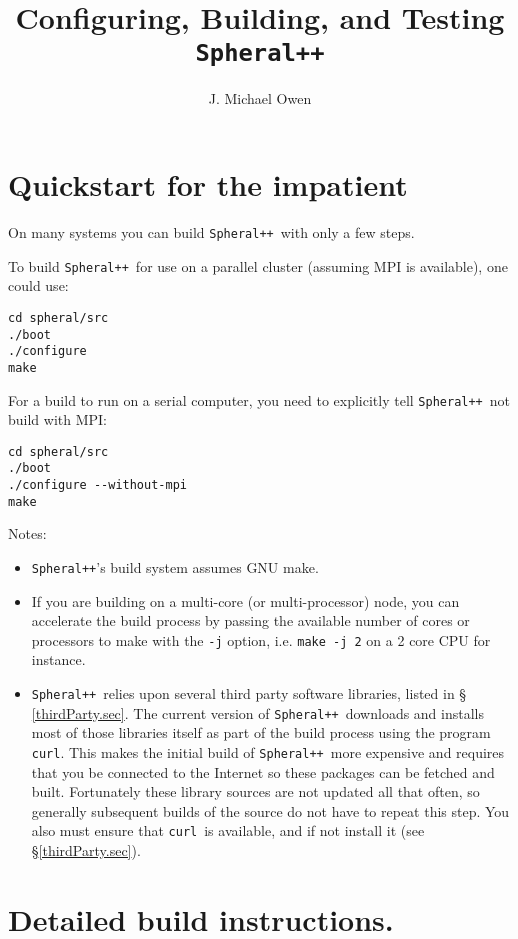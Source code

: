 \documentclass{article}
\newcommand{\Spheral}{{\tt Spheral++}}
\newcommand{\curl}{{\tt curl}}
\begin{document}
\title{Configuring, Building, and Testing \Spheral}
\author{J. Michael Owen}
\maketitle

\section{Quickstart for the impatient}
\label{quick.sec}
On many systems you can build \Spheral\ with only a few steps.

To build \Spheral\ for use on a parallel cluster (assuming MPI is available),
one could use:
\begin{verbatim}
cd spheral/src
./boot
./configure
make
\end{verbatim}

For a build to run on a serial computer, you need to explicitly tell
\Spheral\ not build with MPI:
\begin{verbatim}
cd spheral/src
./boot
./configure --without-mpi
make
\end{verbatim}
Notes:
\begin{itemize}
\item \Spheral's build system assumes GNU make.
\item If you are building on a multi-core (or multi-processor) node, you can
  accelerate the build process by passing the available number of cores or
  processors to make with the \verb+-j+ option, i.e. \verb+make -j 2+ on a 2
  core CPU for instance.
\item \Spheral\ relies upon several third party software libraries, listed in \S
  \ref{thirdParty.sec}.  The current version of \Spheral\ downloads and installs
  most of those libraries itself as part of the build process using the program
  \curl.  This makes the initial build of \Spheral\ more expensive and requires
  that you be connected to the Internet so these packages can be fetched and
  built.  Fortunately these library sources are not updated all that often, so
  generally subsequent builds of the source do not have to repeat this step.
  You also must ensure that \curl\ is available, and if not install it (see
  \S\ref{thirdParty.sec}).
\end{itemize}

\section{Detailed build instructions.}
\end{document}
